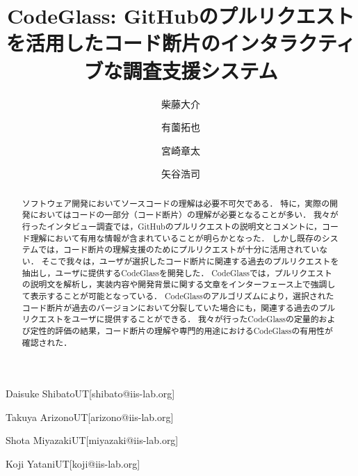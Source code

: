 \documentclass[submit,techrep]{ipsj}
\begin{document}
\title{CodeGlass: GitHubのプルリクエストを活用したコード断片のインタラクティブな調査支援システム}





\author{柴藤大介}{Daisuke Shibato}{UT}[shibato@iis-lab.org]
\author{有薗拓也}{Takuya Arizono}{UT}[arizono@iis-lab.org]
\author{宮崎章太}{Shota Miyazaki}{UT}[miyazaki@iis-lab.org]
\author{矢谷浩司}{Koji Yatani}{UT}[koji@iis-lab.org]

\begin{abstract}
ソフトウェア開発においてソースコードの理解は必要不可欠である．
特に，実際の開発においてはコードの一部分（コード断片）の理解が必要となることが多い．
我々が行ったインタビュー調査では，GitHubのプルリクエストの説明文とコメントに，コード理解において有用な情報が含まれていることが明らかとなった．
しかし既存のシステムでは，コード断片の理解支援のためにプルリクエストが十分に活用されていない．
そこで我々は，ユーザが選択したコード断片に関連する過去のプルリクエストを抽出し，ユーザに提供するCodeGlassを開発した．
CodeGlassでは，プルリクエストの説明文を解析し，実装内容や開発背景に関する文章をインターフェース上で強調して表示することが可能となっている．
CodeGlassのアルゴリズムにより，選択されたコード断片が過去のバージョンにおいて分裂していた場合にも，関連する過去のプルリクエストをユーザに提供することができる．
我々が行ったCodeGlassの定量的および定性的評価の結果，コード断片の理解や専門的用途におけるCodeGlassの有用性が確認された．
\end{abstract}


\end{document}
